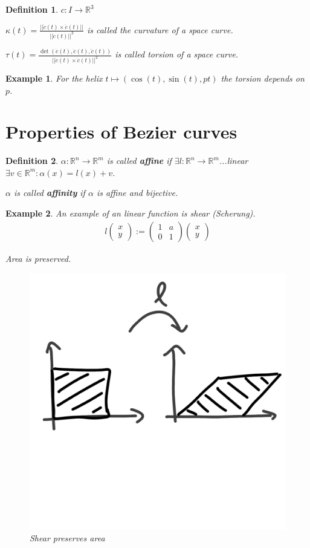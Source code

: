 \documentclass[]{article}
\newtheorem{definition}{Definition}
\newtheorem{example}{Example}
\begin{document}
\begin{definition}
	$c:I \rightarrow \mathbb{R}^3$
	
	$\kappa(t) = \frac{||\dot{c}(t) \times \ddot{c}(t)||}{||\dot{c}(t)||^3}$ is called the curvature of a space curve.
	
	$\tau(t) = \frac{\det (\dot{c}(t), \ddot{c}(t), \dddot{c}(t))}{||\dot{c}(t) \times \ddot{c}(t)||^2}$ is called torsion of a space curve.
\end{definition}

\begin{example}
	For the helix $t \mapsto (\cos(t), \sin(t), pt)$ the torsion depends on $p$.	
\end{example}

\section{Properties of Bezier curves}

\begin{definition}
	$\alpha: \mathbb{R}^n \rightarrow \mathbb{R}^m$ is called \textbf{affine} if $\exists l:\mathbb{R}^n \rightarrow \mathbb{R}^m$...linear $\exists v \in \mathbb{R}^m: \alpha(x) = l(x) + v$.
	
	$\alpha$ is called \textbf{affinity} if $\alpha$ is affine and bijective.
\end{definition}

\begin{example}
	An example of an linear function is shear (Scherung).
	\begin{align*}
		l\left(\begin{matrix} x \\ y \end{matrix}\right) := \left(\begin{matrix} 1 & a \\ 0 & 1 \end{matrix}\right) \left(\begin{matrix} x\\ y \end{matrix}\right)
	\end{align*}
	
	Area is preserved.
	
	\begin{figure}[h!]
		\centering
		\includegraphics[width=0.3\linewidth]{figures/shear}
		\caption{Shear preserves area}
		\label{fig:shear}
	\end{figure}
\end{example}
\end{document}
